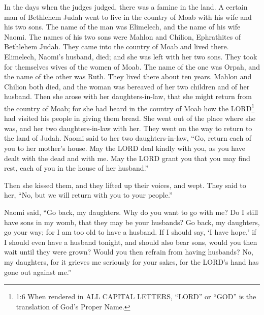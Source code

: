 \newpage
\null
\thispagestyle{empty}
\newpage







\vspace{-1.36in}

\mychapter{} \myverse*{}In the days when the judges judged, there was a famine in the land.
A certain man of Bethlehem Judah went to live in the country of Moab with his wife and his two sons.
\myverse{}The name of the man was Elimelech, and the name of his wife Naomi. The names
of his two sons were Mahlon and Chilion, Ephrathites of Bethlehem Judah. They came into the country of
Moab and lived there.
\myverse{}Elimelech, Naomi’s husband, died; and she was left with her two sons.
\myverse{}They took for themselves wives of the women of Moab. The name of the one was
Orpah, and the name of the other was Ruth. They lived there about ten years.
\myverse{}Mahlon and Chilion both died, and the woman was bereaved of her two children
and of her husband.
\myverse{}Then she arose with her daughters-in-law, that she might return from the country
of Moab; for she had heard in the country of Moab how the LORD\footnote{  1:6 When rendered in ALL CAPITAL LETTERS, “LORD” or “GOD” is the translation of God’s Proper Name.}
had visited his people in giving them bread.
\myverse{}She went out of the place where she was, and her two daughters-in-law with her.
They went on the way to return to the land of Judah.
\myverse{}Naomi said to her two daughters-in-law, “Go, return each of you to her mother’s
house. May the LORD deal kindly with you, as you have dealt with the dead and with me.
\myverse{}May the LORD grant you that you may find rest, each of you in the house of her
husband.”

Then she kissed them, and they lifted up their voices, and wept.
\myverse{}They said to her, “No, but we will return with you to your people.”

\myverse{}Naomi said, “Go back, my daughters. Why do you want to go with
me? Do I still have sons in my womb, that they may be your husbands?
\myverse{}Go back, my daughters, go your way; for I am too old to have a husband. If
I should say, ‘I have hope,’ if I should even have a husband tonight, and should also bear sons,
\myverse{}would you then wait until they were grown? Would you then refrain from having
husbands? No, my daughters, for it grieves me seriously for your sakes, for the LORD’s hand has gone out
against me.”


